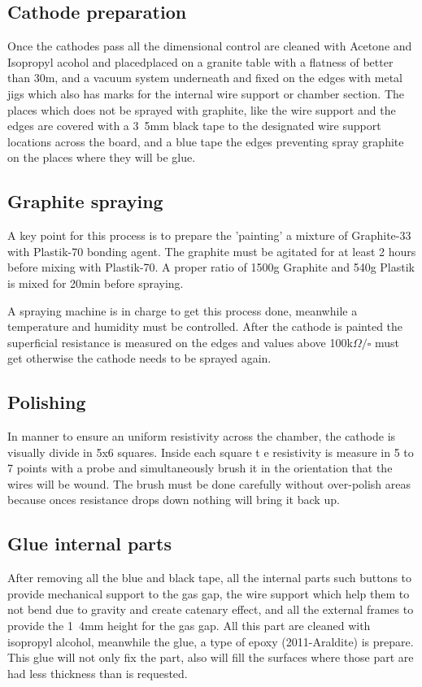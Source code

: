 \subsection{Cathode preparation}
Once the cathodes pass all the dimensional control are cleaned with Acetone and Isopropyl acohol and placedplaced on a granite table with a flatness of better
than 30\micro m, and a vacuum system underneath and fixed on the edges with metal jigs which also has marks for the internal wire support or chamber section.
The places which does not be sprayed with graphite, like the wire support and the edges are covered with a \unit{3.5}{mm} black tape to  the designated wire
support locations across the board, and a blue tape the edges preventing spray graphite on the places where they will be glue. 

\subsection{Graphite spraying}
A key point for this process is to prepare the 'painting' a mixture of Graphite-33 with Plastik-70 bonding agent. The graphite must be agitated for at least 2
hours before mixing with Plastik-70. A proper ratio of 1500g Graphite and 540g Plastik is mixed for 20min before spraying.\par
A spraying machine is in charge to get this process done, meanwhile a temperature and humidity must be controlled. After the cathode is painted the superficial
resistance is measured on the edges and values above \unit{100}{k$\Omega/\square$} must get otherwise the cathode needs to be sprayed again.\par


\subsection{Polishing}
In manner to ensure an uniform resistivity across the chamber, the cathode is visually divide in 5x6 squares. Inside each square t
e resistivity is measure in 5
to 7 points with a probe and simultaneously brush it in the orientation that the wires will be wound. The brush must be done carefully without over-polish areas
because onces resistance drops down nothing will bring it back up. 


\subsection{Glue internal parts}
After removing all the blue and black tape, all the internal parts such buttons to provide mechanical support to the gas gap, the wire support which help them
to not bend due to gravity and create catenary effect, and all the external frames to provide the \unit{1.4}{mm} height for the gas gap. All this part are
cleaned with isopropyl alcohol, meanwhile the glue, a type of epoxy (2011-Araldite) is prepare. This glue will not only fix the part, also will fill the
surfaces where those part are had less thickness than is requested.


